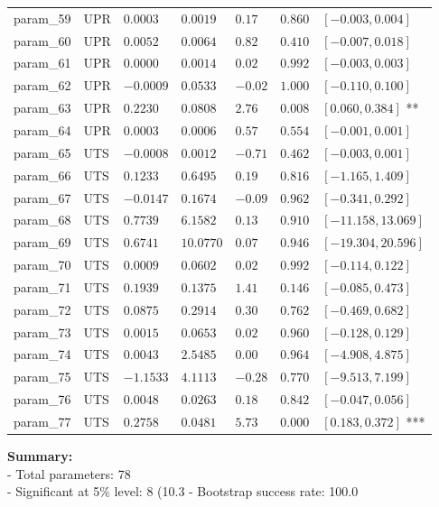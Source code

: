\documentclass{article}
\begin{document}
\begin{longtable}{lllllll}
param\_59 & UPR & $0.0003$ & $0.0019$ & $0.17$ & $0.860$ & $[-0.003, 0.004]$  \\
param\_60 & UPR & $0.0052$ & $0.0064$ & $0.82$ & $0.410$ & $[-0.007, 0.018]$  \\
param\_61 & UPR & $0.0000$ & $0.0014$ & $0.02$ & $0.992$ & $[-0.003, 0.003]$  \\
param\_62 & UPR & $-0.0009$ & $0.0533$ & $-0.02$ & $1.000$ & $[-0.110, 0.100]$  \\
param\_63 & UPR & $0.2230$ & $0.0808$ & $2.76$ & $0.008$ & $[0.060, 0.384]$ ** \\
param\_64 & UPR & $0.0003$ & $0.0006$ & $0.57$ & $0.554$ & $[-0.001, 0.001]$  \\
param\_65 & UTS & $-0.0008$ & $0.0012$ & $-0.71$ & $0.462$ & $[-0.003, 0.001]$  \\
param\_66 & UTS & $0.1233$ & $0.6495$ & $0.19$ & $0.816$ & $[-1.165, 1.409]$  \\
param\_67 & UTS & $-0.0147$ & $0.1674$ & $-0.09$ & $0.962$ & $[-0.341, 0.292]$  \\
param\_68 & UTS & $0.7739$ & $6.1582$ & $0.13$ & $0.910$ & $[-11.158, 13.069]$  \\
param\_69 & UTS & $0.6741$ & $10.0770$ & $0.07$ & $0.946$ & $[-19.304, 20.596]$  \\
param\_70 & UTS & $0.0009$ & $0.0602$ & $0.02$ & $0.992$ & $[-0.114, 0.122]$  \\
param\_71 & UTS & $0.1939$ & $0.1375$ & $1.41$ & $0.146$ & $[-0.085, 0.473]$  \\
param\_72 & UTS & $0.0875$ & $0.2914$ & $0.30$ & $0.762$ & $[-0.469, 0.682]$  \\
param\_73 & UTS & $0.0015$ & $0.0653$ & $0.02$ & $0.960$ & $[-0.128, 0.129]$  \\
param\_74 & UTS & $0.0043$ & $2.5485$ & $0.00$ & $0.964$ & $[-4.908, 4.875]$  \\
param\_75 & UTS & $-1.1533$ & $4.1113$ & $-0.28$ & $0.770$ & $[-9.513, 7.199]$  \\
param\_76 & UTS & $0.0048$ & $0.0263$ & $0.18$ & $0.842$ & $[-0.047, 0.056]$  \\
param\_77 & UTS & $0.2758$ & $0.0481$ & $5.73$ & $0.000$ & $[0.183, 0.372]$ *** \\
\bottomrule
\end{longtable}
\bigskip
\textbf{Summary:}\\
- Total parameters: 78\\
- Significant at 5\% level: 8 (10.3%
- Bootstrap success rate: 100.0%
\end{document}
